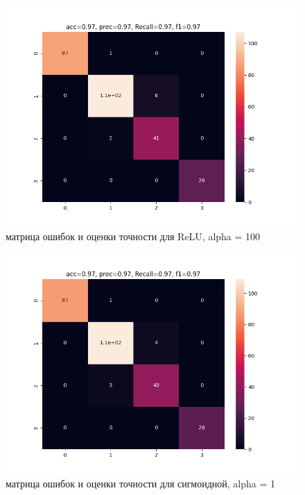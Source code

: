 \documentclass[12pt]{report}
\begin{document}
\begin{figure}[h!]
  \centering
  \includegraphics[width = \linewidth / 2]{matrix_errors_relu_100.png}
  \caption{матрица ошибок и оценки точности для ReLU, alpha = 100}
  \label{fig:relu_100_matrix}
\end{figure}
\newpage
\begin{figure}[h!]
  \centering
  \includegraphics[width = \linewidth / 2]{matrix_errors_sigmoid_1.png}
  \caption{матрица ошибок и оценки точности для сигмоидной, alpha = 1}
  \label{fig:sigmoid_1_matrix}
\end{figure}
\end{document}
